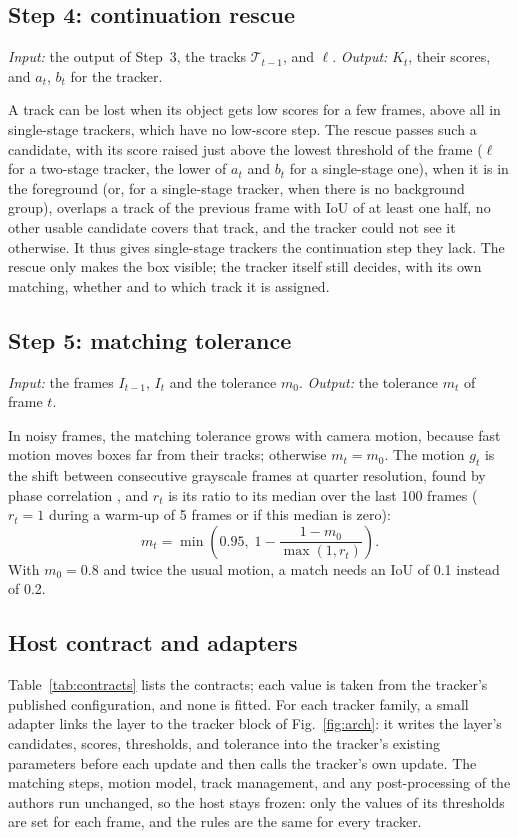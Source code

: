 \subsection{Step 4: continuation rescue}\label{sec:rescue}
\emph{Input:} the output of Step~3, the tracks $\mathcal{T}_{t-1}$, and $\ell$. \emph{Output:}
$K_t$, their scores, and $a_t$, $b_t$ for the tracker.

A track can be lost when its object gets low scores for a few frames, above all in single-stage
trackers, which have no low-score step. The rescue passes such a candidate, with its score raised
just above the lowest threshold of the frame ($\ell$ for a two-stage tracker, the lower of $a_t$
and $b_t$ for a single-stage one), when it is in the foreground (or, for a single-stage tracker,
when there is no background group), overlaps a track of the previous frame with IoU of at least
one half, no other usable candidate covers that track, and the tracker could not see it otherwise.
It thus gives single-stage trackers the continuation step they lack. The rescue only makes the box
visible; the tracker itself still decides, with its own matching, whether and to which track it is
assigned.

\subsection{Step 5: matching tolerance}\label{sec:motion}
\emph{Input:} the frames $I_{t-1}$, $I_t$ and the tolerance $m_0$. \emph{Output:} the tolerance
$m_t$ of frame $t$.

In noisy frames, the matching tolerance grows with camera motion, because fast motion moves boxes
far from their tracks; otherwise $m_t=m_0$. The motion $g_t$ is the shift between consecutive
grayscale frames at quarter resolution, found by phase correlation \cite{reddy1996phasecorr}, and
$r_t$ is its ratio to its median over the last 100 frames ($r_t=1$ during a warm-up of 5 frames or
if this median is zero):
\begin{equation}
m_t=\min\!\left(0.95,\;1-\frac{1-m_0}{\max(1,r_t)}\right).
\label{eq:motion}
\end{equation}
With $m_0=0.8$ and twice the usual motion, a match needs an IoU of 0.1 instead of 0.2.

\subsection{Host contract and adapters}\label{sec:contract}
Table~\ref{tab:contracts} lists the contracts; each value is taken from the tracker's published
configuration, and none is fitted. For each tracker family, a small adapter links the layer to the
tracker block of Fig.~\ref{fig:arch}: it writes the layer's candidates, scores, thresholds, and
tolerance into the tracker's existing parameters before each update and then calls the tracker's
own update. The matching steps, motion model, track management, and any post-processing of the
authors run unchanged, so the host stays frozen: only the values of its thresholds are set for
each frame, and the rules are the same for every tracker.


